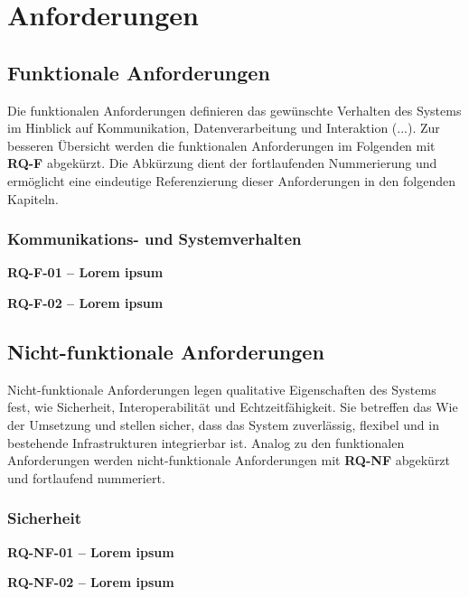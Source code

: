 \section{Anforderungen}\label{sec:S3_RQ}
\noindent \lipsum[1]


\subsection{Funktionale Anforderungen}
Die funktionalen Anforderungen definieren das gewünschte Verhalten des Systems im Hinblick auf Kommunikation, Datenverarbeitung und Interaktion (...). Zur besseren Übersicht werden die funktionalen Anforderungen im Folgenden mit \textbf{RQ-F} abgekürzt. Die Abkürzung dient der fortlaufenden Nummerierung und ermöglicht eine eindeutige Referenzierung dieser Anforderungen in den folgenden Kapiteln.
\subsubsection{Kommunikations- und Systemverhalten}
\hypertarget{RQ-F-01}{\textbf{RQ-F-01 – Lorem ipsum}}\newline
\noindent \lipsum[1]\newline

\hypertarget{RQ-F-02}{\textbf{RQ-F-02 – Lorem ipsum}}\newline
\noindent \lipsum[1]\newline

\subsection{Nicht-funktionale Anforderungen}
Nicht-funktionale Anforderungen legen qualitative Eigenschaften des Systems fest, wie Sicherheit, Interoperabilität und Echtzeitfähigkeit. Sie betreffen das Wie der Umsetzung und stellen sicher, dass das System zuverlässig, flexibel und in bestehende Infrastrukturen integrierbar ist. Analog zu den funktionalen Anforderungen werden nicht-funktionale Anforderungen mit \textbf{RQ-NF} abgekürzt und fortlaufend nummeriert.
\subsubsection{Sicherheit}
\hypertarget{RQ-NF-01}{\textbf{RQ-NF-01 – Lorem ipsum}}\newline
\noindent \lipsum[1]\newline

\hypertarget{RQ-NF-02}{\textbf{RQ-NF-02 – Lorem ipsum}}\newline
\noindent \lipsum[1]\newline
